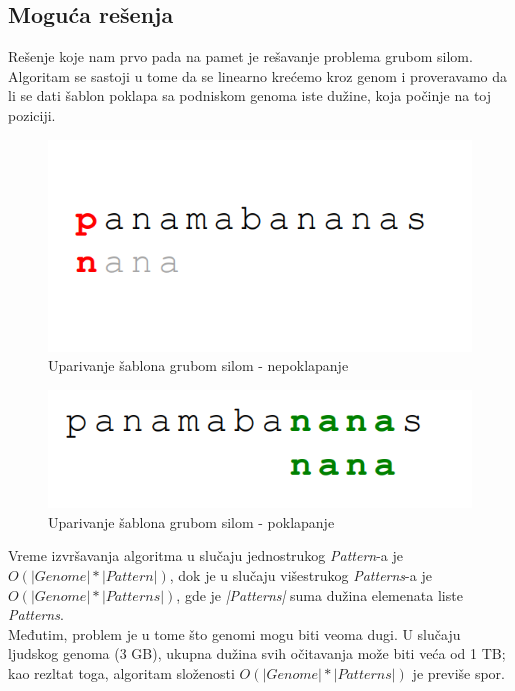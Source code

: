 \newpage
\subsection{Moguća rešenja}

Rešenje koje nam prvo pada na pamet je rešavanje problema grubom silom. Algoritam se sastoji u tome da se linearno krećemo kroz genom i proveravamo da li se dati šablon poklapa sa podniskom genoma iste dužine, koja počinje na toj poziciji.



\begin{figure}[h!]
\centering
\includegraphics[scale=0.5]{poglavlja/9/slike/GrubaSilaGreska.png}
\caption{Uparivanje šablona grubom silom - nepoklapanje}
\label{slika:X}
\end{figure}

\begin{figure}[h!]
\centering
\includegraphics[scale=0.5]{poglavlja/9/slike/GrubaSilaPogodak.png}
\caption{Uparivanje šablona grubom silom - poklapanje}
\label{slika:X}
\end{figure}

Vreme izvršavanja algoritma u slučaju jednostrukog \textit{Pattern}-a je $O(|Genome| * |Pattern|)$, dok je u slučaju višestrukog \textit{Patterns}-a je $O(|Genome| * |Patterns|)$, gde je \textit{|Patterns|} suma dužina elemenata liste \textit{Patterns}. \\
Međutim, problem je u tome što genomi mogu biti veoma dugi. U slučaju ljudskog genoma (3 GB), ukupna dužina svih očitavanja može biti veća od 1 TB; kao rezltat toga, algoritam složenosti $O(|Genome| * |Patterns|)$ je previše spor.

